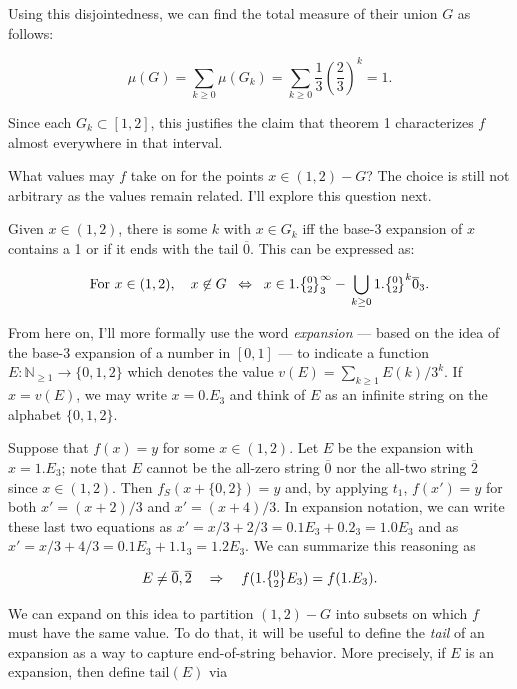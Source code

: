 \documentclass[]{article}
\begin{document}
Using this disjointedness, we can find the total measure of their union
\(G\) as follows:

\[\mu(G) = \sum_{k \ge 0}\mu(G_k) = \sum_{k\ge 0}
\frac{1}{3}\left(\frac{2}{3}\right)^k = 1.\]

Since each \(G_k\subset [1,2]\), this justifies the claim that theorem 1
characterizes \(f\) almost everywhere in that interval.

What values may \(f\) take on for the points \(x\in (1,2) - G\)? The
choice is still not arbitrary as the values remain related. I'll explore
this question next.

Given \(x\in (1,2)\), there is some \(k\) with \(x\in G_k\) iff the
base-3 expansion of \(x\) contains a 1 or if it ends with the tail
\(\overline{0}\). This can be expressed as:

\begin{equation}\text{For } x\in (1,2), \quad
  x\not\in G \;\;\Leftrightarrow\;\; x \in 1.\zerotwo^\infty_3 -\,
  \bigcup_{k\ge 0} 1.\zerotwo^k\overline{0}_3.\label{eq:onetwo_lessG}\end{equation}

From here on, I'll more formally use the word \emph{expansion} --- based
on the idea of the base-3 expansion of a number in \([0,1]\) --- to
indicate a function \(E:\mathbb{N}_{\ge 1}\to \{0, 1, 2\}\) which
denotes the value \(v(E) = \sum_{k\ge 1}E(k)/3^k.\) If \(x=v(E)\), we
may write \(x = 0.E_3\) and think of \(E\) as an infinite string on the
alphabet \(\{0,1,2\}\).

Suppose that \(f(x) = y\) for some \(x\in (1,2)\). Let \(E\) be the
expansion with \(x=1.E_3\); note that \(E\) cannot be the all-zero
string \(\overline 0\) nor the all-two string \(\overline 2\) since
\(x\in (1,2)\). Then \(f_S(x+\{0,2\}) = y\) and, by applying \(t_1\),
\(f(x') = y\) for both \(x' = (x+2)/3\) and \(x' = (x+4)/3\). In
expansion notation, we can write these last two equations as
\(x' = x/3 + 2/3 = 0.1E_3 + 0.2_3 = 1.0E_3\) and as
\(x' = x/3 + 4/3 = 0.1E_3 + 1.1_3 = 1.2E_3\). We can summarize this
reasoning as

\begin{equation}E\ne \overline 0, \overline 2 \quad\Rightarrow\quad
f(1.\zerotwo E_3) = f(1.E_3).\label{eq:h_reln}\end{equation}

\newcommand{\tail}{\text{tail}}

We can expand on this idea to partition \((1,2) - G\) into subsets on
which \(f\) must have the same value. To do that, it will be useful to
define the \emph{tail} of an expansion as a way to capture end-of-string
behavior. More precisely, if \(E\) is an expansion, then define
\(\tail(E)\) via
\end{document}
